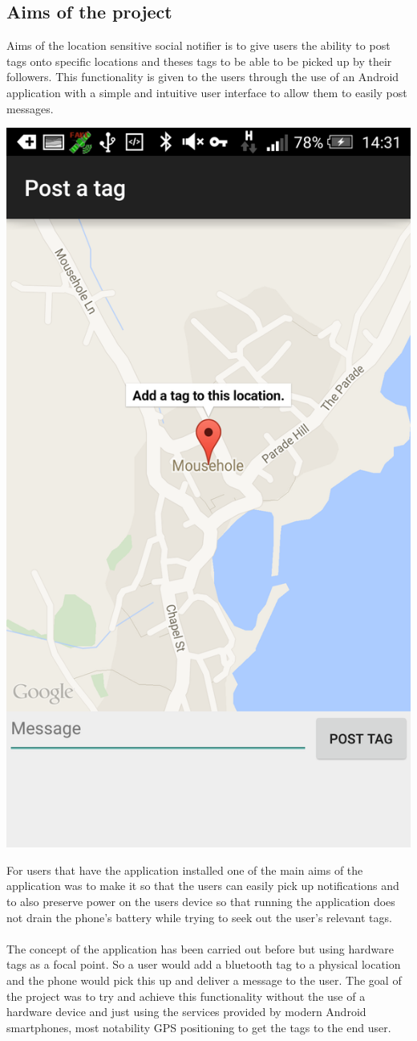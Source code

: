 \documentclass[a0,landscape]{a0poster}
\begin{document}
\begin{multicols}{5}
\color{Black}
\section{Aims of the project}

Aims of the location sensitive social notifier is to give users the ability to post tags onto specific locations and theses tags to be able to be picked up by their followers. This functionality is given to the users through the use of an Android application with a simple and intuitive user interface to allow them to easily post messages.\\

\begin{center}
\includegraphics[width=0.39\linewidth]{posting}
\end{center}

For users that have the application installed one of the main aims of the application was to make it so that the users can easily pick up notifications and to also preserve power on the users device so that running the application does not drain the phone's battery while trying to seek out the user's relevant tags.\\
\\
The concept of the application has been carried out before but using hardware tags as a focal point. So a user would add a bluetooth tag to a physical location and the phone would pick this up and deliver a message to the user. The goal of the project was to try and achieve this functionality without the use of a hardware device and just using the services provided by modern Android smartphones, most notability GPS positioning to get the tags to the end user.


\end{multicols}
\end{document}
